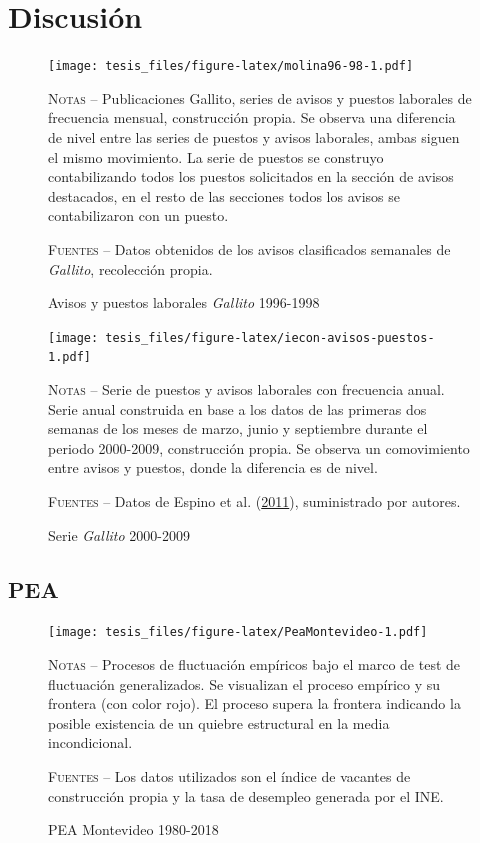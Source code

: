 \documentclass[12pt,oneside]{reedthesis}
\begin{document}
\hypertarget{discusiuxf3n}{%
\section{Discusión}\label{discusiuxf3n}}
\begin{figure}
\texttt{[image: tesis\_files/figure-latex/molina96-98-1.pdf]}
\caption{Avisos y puestos laborales \textit{Gallito} 1996-1998}\label{fig:molina96-98}\textsc{}

\footnotesize\textsc{Notas} -- Publicaciones Gallito, series de avisos y puestos laborales de frecuencia mensual, construcción propia. Se observa una diferencia de nivel entre las series de puestos y avisos laborales, ambas siguen el mismo movimiento. La serie de puestos se construyo contabilizando todos los puestos solicitados en la sección de avisos destacados, en el resto de las secciones todos los avisos se contabilizaron con un puesto.

\textsc{Fuentes} -- Datos obtenidos de los avisos clasificados semanales de \textit{Gallito}, recolección propia.
\end{figure}

\begin{figure}
\texttt{[image: tesis\_files/figure-latex/iecon-avisos-puestos-1.pdf]}
\caption{Serie \textit{Gallito} 2000-2009}\label{fig:iecon-avisos-puestos}\textsc{}

\footnotesize\textsc{Notas} -- Serie de puestos y avisos laborales con frecuencia anual. Serie anual construida en base a los datos de las primeras dos semanas de los meses de marzo, junio y septiembre durante el periodo 2000-2009, construcción propia. Se observa un comovimiento entre avisos y puestos, donde la diferencia es de nivel.

\textsc{Fuentes} -- Datos de Espino et al. (\protect\hyperlink{ref-Alma2011}{2011}), suministrado por autores.
\end{figure}
\newpage

\hypertarget{pea}{%
\subsection{PEA}\label{pea}}
\begin{figure}
\texttt{[image: tesis\_files/figure-latex/PeaMontevideo-1.pdf]}
\caption{PEA Montevideo 1980-2018}\label{fig:PeaMontevideo}\textsc{}

\footnotesize\textsc{Notas} -- Procesos de fluctuación empíricos bajo el marco de test de fluctuación generalizados. Se visualizan el proceso empírico y su frontera (con color rojo). El proceso supera la frontera indicando la posible existencia de un quiebre estructural en la media incondicional.

\textsc{Fuentes} -- Los datos utilizados son el índice de vacantes de construcción propia y la tasa de desempleo generada por el INE.
\end{figure}

\end{document}
